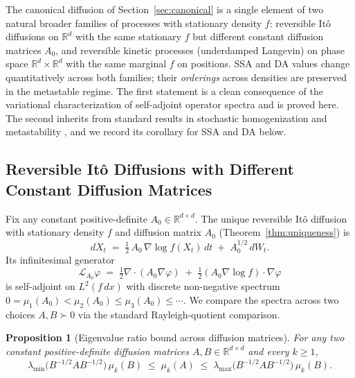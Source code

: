 \documentclass{article}
\newcommand{\R}{\mathbb{R}}
\newtheorem{proposition}{Proposition}
\begin{document}
The canonical diffusion of Section~\ref{sec:canonical} is a single element of two natural broader families of processes with stationary density $f$: reversible It\^o diffusions on $\R^d$ with the same stationary $f$ but different constant diffusion matrices $A_0$, and reversible kinetic processes (underdamped Langevin) on phase space $\R^d \times \R^d$ with the same marginal $f$ on positions. SSA and DA values change quantitatively across both families; their \emph{orderings} across densities are preserved in the metastable regime. The first statement is a clean consequence of the variational characterization of self-adjoint operator spectra and is proved here. The second inherits from standard results in stochastic homogenization \cite{pavliotis_stuart2008,Pavliotis2014} and metastability \cite{bovier_dh2015,kramers1940,nelson1967}, and we record its corollary for SSA and DA below.

\subsection{Reversible It\^o Diffusions with Different Constant Diffusion Matrices}
\label{app:robustness_ito}

Fix any constant positive-definite $A_0 \in \R^{d \times d}$. The unique reversible It\^o diffusion with stationary density $f$ and diffusion matrix $A_0$ (Theorem~\ref{thm:uniqueness}) is
\[
dX_t \;=\; \tfrac{1}{2}\,A_0\,\nabla \log f(X_t)\,dt \;+\; A_0^{1/2}\,dW_t.
\]
Its infinitesimal generator
\[
\mathcal{L}_{A_0}\varphi \;=\; \tfrac{1}{2}\nabla \cdot (A_0 \nabla \varphi) \;+\; \tfrac{1}{2}(A_0\nabla \log f)\cdot \nabla \varphi
\]
is self-adjoint on $L^2(f\,dx)$ with discrete non-negative spectrum
$0 = \mu_1(A_0) < \mu_2(A_0) \le \mu_3(A_0) \le \cdots$. We compare the spectra across two choices $A, B \succ 0$ via the standard Rayleigh-quotient comparison.

\begin{proposition}[Eigenvalue ratio bound across diffusion matrices]
\label{prop:robustness_ito}
For any two constant positive-definite diffusion matrices $A, B \in \R^{d\times d}$ and every $k \ge 1$,
\[
\lambda_{\min}\!\bigl(B^{-1/2} A B^{-1/2}\bigr)\,\mu_k(B) \;\le\; \mu_k(A) \;\le\; \lambda_{\max}\!\bigl(B^{-1/2} A B^{-1/2}\bigr)\,\mu_k(B).
\]
\end{proposition}
\end{document}
